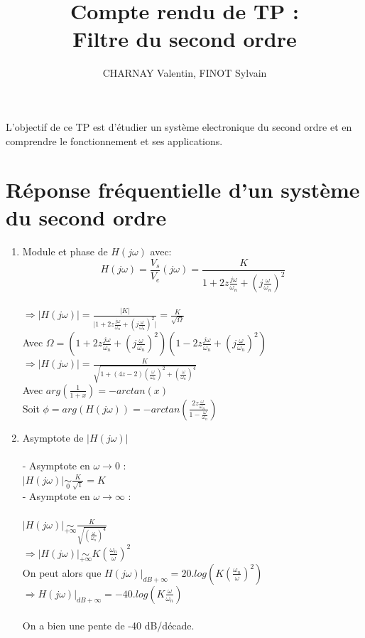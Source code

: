 \documentclass[12pt,a4paper]{article}
\author{CHARNAY Valentin, FINOT Sylvain}
\title{Compte rendu de TP : \\ Filtre du second ordre}
\begin{document}
\maketitle
L'objectif de ce TP est d'étudier un système electronique du second ordre et en comprendre le fonctionnement et ses applications.
\section{Réponse fréquentielle d'un système du second ordre}
\begin{enumerate}
\item Module et phase de $H(j\omega)$ avec:
 $$H(j\omega) = \frac{V_s}{V_e}(j\omega) = \frac{K}{1+2z\frac{j\omega}{\omega _n}+ \left(j\frac{\omega}{\omega _n}\right)^2}$$\\
 
 $\Rightarrow \vert H(j\omega) \vert = \frac{\vert K \vert}{\vert 1+2z\frac{j\omega}{\omega _n}+ \left(j\frac{\omega}{\omega _n}\right)^2 \vert } = \frac{K}{\sqrt{\Omega}} $\\
 Avec $\Omega = \left(1+2z\frac{j\omega}{\omega _n}+ \left(j\frac{\omega}{\omega _n}\right)^2\right)\left(1-2z\frac{j\omega}{\omega _n}+ \left(j\frac{\omega}{\omega _n}\right)^2\right)$\\
 
$\Rightarrow \vert H(j\omega) \vert  =\frac{K}{\sqrt{1 + (4z -2)(\frac{\omega}{\omega_n})^2 + (\frac{\omega}{\omega_n})^4}}  $\\
Avec $arg\left(\frac{1}{1+x}\right)= - arctan(x)$\\
Soit $\phi = arg\left( H(j\omega) \right) = - arctan\left(\frac{2z\frac{\omega}{\omega_n}}{1-\frac{\omega}{\omega_n}}\right)$\\

\item Asymptote de $\vert H(j\omega) \vert$\\
\\
- Asymptote en $\omega \rightarrow 0$ :\\
$\vert H(j\omega) \vert \underset{0}{\sim} \frac{K}{\sqrt{1}} = K $\\
- Asymptote en $\omega \rightarrow \infty $ :\\
\\
$\vert H(j\omega) \vert \underset{+\infty}{\sim} \frac{K}{\sqrt{\left(\frac{\omega}{\omega_n}\right)^4}}$\\
$\Rightarrow \vert H(j\omega) \vert \underset{+\infty}{\sim} K\left( \frac{\omega_n}{\omega}\right)^2 $\\
On peut alors que $H(j\omega) \vert_{dB +\infty} = 20. log( K\left( \frac{\omega_n}{\omega}\right)^2) $\\
$\Rightarrow H(j\omega) \vert_{dB +\infty} = -40. log(K\frac{\omega}{\omega_n})$\\
\\
On a bien une pente de -40 dB/décade.
\end{enumerate}
\end{document}
